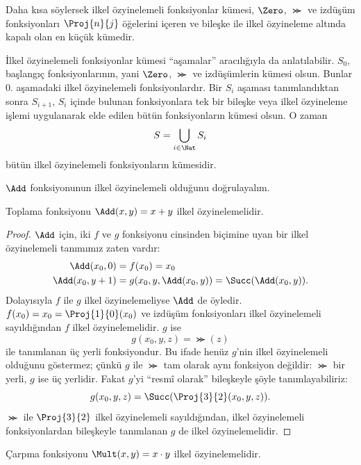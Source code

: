 \begin{explain}
Daha kısa söylersek ilkel özyinelemeli fonksiyonlar kümesi, $\Zero$,
$\Succ$ ve izdüşüm fonksiyonları $\Proj{n}{j}$ öğelerini içeren ve bileşke
ile ilkel özyineleme altında kapalı olan en küçük kümedir.

İlkel özyinelemeli fonksiyonlar kümesi ``aşamalar'' aracılığıyla da
anlatılabilir. $S_0$, başlangıç fonksiyonlarının, yani $\Zero$, $\Succ$ ve
izdüşümlerin kümesi olsun. Bunlar $0$. aşamadaki ilkel özyinelemeli
fonksiyonlardır. Bir $S_i$ aşaması tanımlandıktan sonra $S_{i+1}$, $S_i$
içinde bulunan fonksiyonlara tek bir bileşke veya ilkel özyineleme işlemi
uygulanarak elde edilen bütün fonksiyonların kümesi olsun. O zaman
\[
  S=\bigcup_{i\in\Nat}S_i
\]
bütün ilkel özyinelemeli fonksiyonların kümesidir.
\end{explain}

$\Add$ fonksiyonunun ilkel özyinelemeli olduğunu doğrulayalım.

\begin{prop}
  Toplama fonksiyonu $\Add(x,y)=x+y$ ilkel özyinelemelidir.
\end{prop}

\begin{proof}
$\Add$ için, iki $f$ ve $g$ fonksiyonu cinsinden
 biçimine uyan bir ilkel özyinelemeli tanımımız
zaten vardır:
\begin{align*}
  \Add(x_0,0) & = f(x_0)=x_0 \\
  \Add(x_0,y+1) & = g(x_0,y,\Add(x_0,y))=\Succ(\Add(x_0,y)).
\end{align*}
Dolayısıyla $f$ ile $g$ ilkel özyinelemeliyse $\Add$ de öyledir.
$f(x_0)=x_0=\Proj{1}{0}(x_0)$ ve izdüşüm fonksiyonları ilkel özyinelemeli
sayıldığından $f$ ilkel özyinelemelidir. $g$ ise
\[
  g(x_0,y,z)=\Succ(z)
\]
ile tanımlanan üç yerli fonksiyondur. Bu ifade henüz $g$'nin ilkel
özyinelemeli olduğunu göstermez; çünkü $g$ ile $\Succ$ tam olarak aynı
fonksiyon değildir: $\Succ$ bir yerli, $g$ ise üç yerlidir. Fakat $g$'yi
``resmî olarak'' bileşkeyle şöyle tanımlayabiliriz:
\[
  g(x_0,y,z)=\Succ(\Proj{3}{2}(x_0,y,z)).
\]
$\Succ$ ile $\Proj{3}{2}$ ilkel özyinelemeli sayıldığından, ilkel
özyinelemeli fonksiyonlardan bileşkeyle tanımlanan $g$ de ilkel
özyinelemelidir.
\end{proof}

\begin{prop}
  Çarpma fonksiyonu $\Mult(x,y)=x\cdot y$ ilkel özyinelemelidir.
\end{prop}

